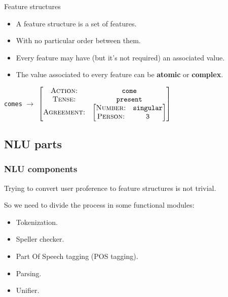 \documentclass[11pt]{beamer}
\begin{document}
\begin{frame}
	\begin{block}{Feature structures}
	\begin{itemize}
		\item A feature structure is a set of features.
		\item With no particular order between them.
		\item Every feature may have (but it's not required) an associated value.
		\item The value associated to every feature can be \textbf{atomic} or \textbf{complex}.
	\end{itemize}
	\end{block}
	\vspace{10pt}
	\pause
	\begin{center}
		\texttt{comes} \small $\longrightarrow$ 
				$\begin{bmatrix}
						\textsc{Action:}      & \texttt{come}\\ 
						\textsc{Tense:}     	& \texttt{present}\\ 
						\textsc{Agreement:}   & \begin{bmatrix}
																			\textsc{Number:} & \texttt{singular}\\ 
																			\textsc{Person:} & \texttt{3}\\ 
																		\end{bmatrix}
				\end{bmatrix}$
			\end{center}
\end{frame}

\subsection{NLU parts}

\begin{frame}
	\frametitle{NLU components}
	Trying to convert user proference to feature structures is not trivial. \par
	So we need to divide the process in some functional modules:
	\pause
	\vspace{10pt}
	\begin{itemize}
		\item Tokenization.
		\item Speller checker.
		\item Part Of Speech tagging (POS tagging).
		\item Parsing.
		\item Unifier.
	\end{itemize}
\end{frame}
\end{document}
